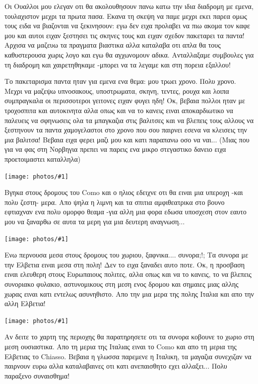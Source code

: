 \documentclass[11pt, letterpaper]{book}
\newcommand\photo[1]{\begin{center}\noindent\texttt{[image: photos/\#1]}\end{center}}
\begin{document}
Οι Ουαλλοι μου ελεγαν οτι θα ακολουθησουν πανω κατω την ιδια διαδρομη με εμενα, τουλαχιστον μεχρι τα πρωτα πασα. Εκανα τη σκεψη να παμε μεχρι εκει παρεα ομως τους ειδα να βιαζονται να ξεκινησουν: εγω δεν ειχα προλαβει να πιω ακομα τον καφε μου και αυτοι ειχαν ξεστησει τις σκηνες τους και ειχαν σχεδον πακεταρει τα παντα! 
Αρχισα να μαζευω τα πραγματα βιαστικα αλλα καταλαβα οτι απλα θα τους καθυστερουσα χωρις λογο και εγω θα αγχωνομουν αδικα. Ανταλλαξαμε συμβουλες για τη διαδρομη και χαιρετηθηκαμε -μπορει να τα λεγαμε και στη πορεια εξαλλου!

Το πακεταρισμα παντα ηταν για εμενα ενα θεμα: μου τρωει χρονο. Πολυ χρονο. Μεχρι να μαζεψω υπνοσακους, υποστρωματα, σκηνη, τεντες, ρουχα και λοιπα συμπραγκαλα οι περισσοτεροι γειτονες ειχαν φυγει ηδη! Οκ, βεβαια πολλοι ηταν με τροχοσπιτα και αυτοκινητα αλλα οπως και να το κανεις ειναι αποκαρδιωτικο να παλευεις να σφηνωσεις ολα τα μπαγκαζια στις βαλιτσες και να βλεπεις τους αλλους να ξεστηνουν τα παντα χαμογελαστοι στο χρονο που σου παιρνει εσενα να κλεισεις την μια βαλιτσα! 
Βεβαια ειχα φερει μαζι μου και κατι παραπανω οσο να ναι... (Μιας που για να φας στη Νορβηγια πρεπει να παρεις ενα μικρο στεγαστικο δανειο ειχα προετοιμαστει καταλληλα)

\photo{22.jpg}

Βγηκα στους δρομους του Como και ο ηλιος εδειχνε οτι θα ειναι μια υπεροχη -και πολυ ζεστη- μερα. 
Απο ψηλα η λιμνη και τα σπιτια αμφιθεατρικα στο βουνο εφτιαχναν ενα πολυ ομορφο θεαμα -για αλλη μια φορα εδωσα υποσχεση στον εαυτο μου να ξαναρθω σε αυτα τα μερη για μια δευτερη αναγνωση...

\photo{23.jpg}

Ενω περνουσα μεσα στους δρομους του χωριου, ξαφνικα.... συνορα;!; Τα συνορα με την Ελβετια ειναι μεσα στη πολη! 
Δεν το ειχα ξαναδει αυτο ποτε. Οκ, η προσβαση ειναι ελευθερη στους Ευρωπαιους πολιτες, αλλα οπως και να το κανεις, το να βλεπεις συνοριακο φυλακιο, αστυνομικους στη μεση ενος δρομου και σημαιες μιας αλλης χωρας ειναι κατι εντελως ασυνηθιστο. 
Απο την μια μερα της πολης Ιταλια και απο την αλλη Ελβετια!

\photo{24.jpg}

Αν δειτε το χαρτη της περιοχης θα παρατηρησετε οτι τα συνορα κοβουνε το χωριο στη μεση ουσιαστικα. Απο τη μερια της Ιταλιας ειναι το Como και απο τη μερια της Ελβετιας το Chiasso. Βεβαια η γλωσσα παρεμενε η Ιταλικη, τα μαγαζια συνεχιζαν να παιρνουν ευρω αλλα καταλαβαινες οτι κατι ανεπαισθητο εχει αλλαξει... Πολυ παραξενο συναισθημα! 
\end{document}
